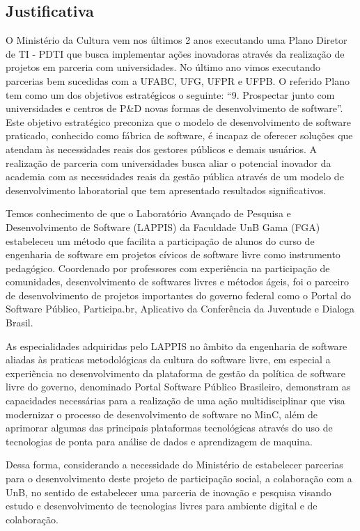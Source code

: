 
\subsection{Justificativa}


O Ministério da Cultura vem nos últimos 2 anos executando uma Plano Diretor de TI - PDTI que busca implementar ações inovadoras através da
realização de projetos em parceria com universidades. No último ano vimos executando parcerias bem sucedidas com a UFABC, UFG, UFPR e UFPB.
O referido Plano tem como um dos objetivos estratégicos o seguinte: “9. Prospectar junto com universidades e centros de P\&D novas formas de
desenvolvimento de software”. Este objetivo estratégico preconiza que o modelo de desenvolvimento de software praticado, conhecido como fábrica
de software, é incapaz de oferecer soluções que atendam às necessidades reais dos gestores públicos e demais usuários. A realização de parceria
com universidades busca aliar o potencial inovador da academia com as necessidades reais da gestão pública através de um modelo de desenvolvimento
laboratorial que tem apresentado resultados significativos.

Temos conhecimento de que o Laboratório Avançado de Pesquisa e Desenvolvimento de Software (LAPPIS) da Faculdade UnB Gama (FGA) estabeleceu um
método que facilita a participação de alunos do curso de engenharia de software em projetos cívicos de software livre como instrumento pedagógico. 
Coordenado por professores com experiência na participação de comunidades, desenvolvimento de softwares livres e métodos ágeis, foi o parceiro de 
desenvolvimento de projetos importantes do governo federal como o Portal do Software Público, Participa.br, Aplicativo da Conferência da Juventude e
Dialoga Brasil.

As especialidades adquiridas pelo LAPPIS no âmbito da engenharia de software aliadas às praticas metodológicas da cultura do software livre, em
especial a experiência no desenvolvimento da plataforma de gestão da política de software livre do governo, denominado Portal Software Público 
Brasileiro, demonstram as capacidades necessárias para a realização de uma ação multidisciplinar que visa modernizar o processo de desenvolvimento
de software no MinC, além de aprimorar algumas das principais plataformas tecnológicas através do uso de tecnologias de ponta para análise de dados 
e aprendizagem de maquina.

Dessa forma, considerando a necessidade do Ministério de estabelecer parcerias para o desenvolvimento deste projeto de participação social, a
colaboração com a UnB, no sentido de estabelecer uma parceria de inovação e pesquisa visando estudo e desenvolvimento de tecnologias livres para 
ambiente digital e de colaboração.
